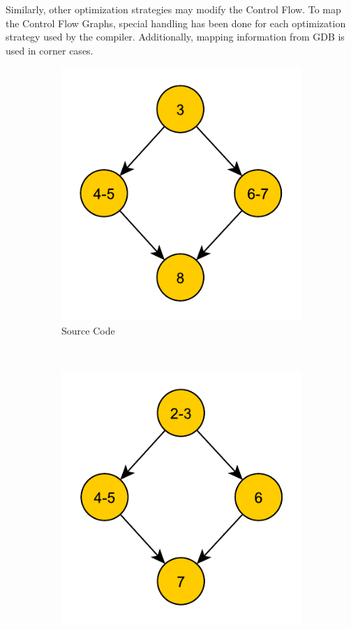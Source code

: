 Similarly, other optimization strategies may modify the Control Flow. To map the Control Flow Graphs, special handling has been done for each optimization strategy used by the compiler. Additionally, mapping information from GDB is used in corner cases.

\begin{figure}[h!]
\centering
\begin{subfigure}[t]{.33\textwidth}
\captionsetup{margin=10pt}
\includegraphics[width=\textwidth]{figures/CondExecSrcFlowChart.pdf}
\caption{Source Code}
\label{fig:cfgSrc}
\end{subfigure}%
~
\begin{subfigure}[t]{.33\textwidth}
\captionsetup{margin=10pt}
\includegraphics[width=\textwidth]{figures/CondExecObjUnoptFlowChart.pdf}

\end{subfigure}
\end{figure}

